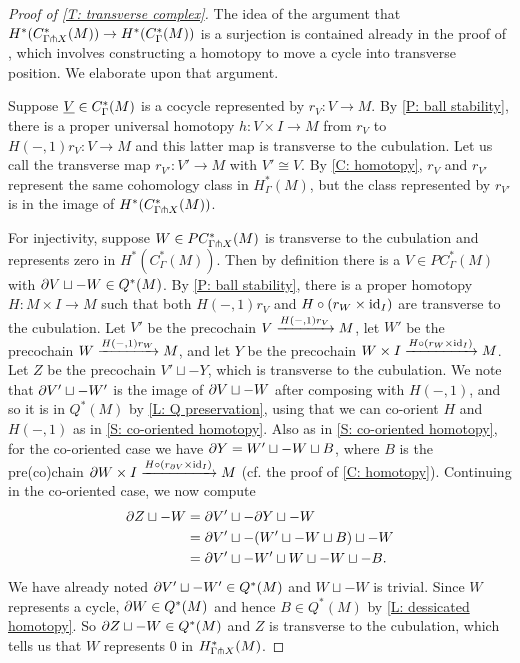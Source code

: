\begin{proof}[Proof of \cref{T: transverse complex}]
	The idea of the argument that $H^*(C^*_{\Gamma \pitchfork X}(M)) \to H^*(C_\Gamma^*(M))$ is a surjection is contained already in the proof of \cite[Lemma 15]{Lipy14}, which involves constructing a homotopy to move a cycle into transverse position.
	We elaborate upon that argument.

	Suppose $\underline{V} \in C_\Gamma^*(M)$ is a cocycle represented by $r_V \colon V \to M$.
	By \cref{P: ball stability}, there is a proper universal homotopy $h \colon V \times I \to M$ from $r_V$ to $H(-,1)r_{V} \colon V \to M$ and this latter map is transverse to the cubulation.
	Let us call the transverse map $r_{V'} \colon V' \to M$ with $V' \cong V$.
	By \cref{C: homotopy}, $r_V$ and $r_{V'}$ represent the same cohomology class in $H^*_{\Gamma}(M)$, but the class represented by $r_{V'}$ is in the image of $H^*(C^*_{\Gamma \pitchfork X}(M))$.

	For injectivity, suppose $W \in PC^*_{\Gamma \pitchfork X}(M)$ is transverse to the cubulation and represents zero in $H^*(C_\Gamma^*(M))$.
	Then by definition there is a $V \in PC^*_\Gamma(M)$ with $\partial V \sqcup -W \in Q^*(M)$.
	By \cref{P: ball stability}, there is a proper homotopy $H \colon M \times I \to M$ such that both $H(-,1)r_V$ and $H\circ (r_W \times \mathrm{id}_I)$ are transverse to the cubulation.
	Let $V'$ be the precochain $V \xrightarrow{H(-,1)r_V} M$, let $W'$ be the precochain $W \xrightarrow{H(-,1)r_W} M$, and let $Y$ be the precochain $W \times I \xrightarrow{H\circ (r_W \times \mathrm{id}_I)} M$.
	Let $Z$ be the precochain $V' \sqcup -Y$, which is transverse to the cubulation.
	We note that $\partial V' \sqcup -W'$ is the image of $\partial V \sqcup -W$ after composing with $H(-,1)$, and so it is in $Q^*(M)$ by \cref{L: Q preservation}, using that we can co-orient $H$ and $H(-,1)$ as in \cref{S: co-oriented homotopy}.
	Also as in \cref{S: co-oriented homotopy}, for the co-oriented case we have $\partial Y = W' \sqcup -W \sqcup B$, where $B$ is the pre(co)chain $\partial W \times I \xrightarrow{H\circ (r_{\partial V} \times \mathrm{id}_I)} M$ (cf. the proof of \cref{C: homotopy}).
	Continuing in the co-oriented case, we now compute
	\begin{align*}
		\partial Z \sqcup -W &= \partial V' \sqcup -\partial Y \sqcup -W\\
		&= \partial V' \sqcup -(W' \sqcup -W \sqcup B) \sqcup -W\\
		&= \partial V' \sqcup -W' \sqcup W \sqcup -W \sqcup -B.
	\end{align*}
	We have already noted $\partial V' \sqcup -W' \in Q^*(M)$ and $W \sqcup -W$ is trivial.
	Since $W$ represents a cycle, $\partial W \in Q^*(M)$ and hence $B \in Q^*(M)$ by \cref{L: dessicated homotopy}.
	So $\partial Z \sqcup -W \in Q^*(M)$ and $Z$ is transverse to the cubulation, which tells us that $W$ represents $0$ in $H^*_{\Gamma \pitchfork X}(M)$.
\end{proof}

